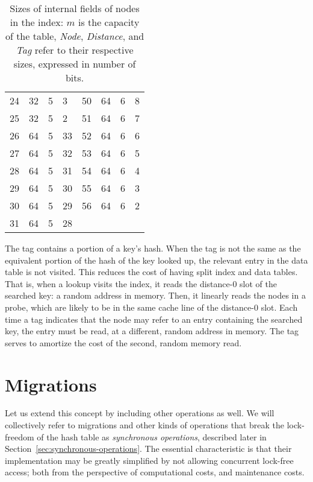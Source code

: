 \begin{table}
\begin{tabular}{llll|llll}
                  24       & 32   & 5        & 3   & 50       & 64   & 6        & 8   \\
                  25       & 32   & 5        & 2   & 51       & 64   & 6        & 7   \\
                  26       & 64   & 5        & 33  & 52       & 64   & 6        & 6   \\
                  27       & 64   & 5        & 32  & 53       & 64   & 6        & 5   \\
                  28       & 64   & 5        & 31  & 54       & 64   & 6        & 4   \\
                  29       & 64   & 5        & 30  & 55       & 64   & 6        & 3   \\
                  30       & 64   & 5        & 29  & 56       & 64   & 6        & 2   \\
                  31 & 64 & 5 & 28 & \\
    \end{tabular}
    \caption{Sizes of internal fields of nodes in the index: $m$ is the capacity of the table, \emph{Node}, \emph{Distance}, and \emph{Tag} refer to their respective sizes, expressed in number of bits.}
    \label{tab:nodes}
\end{table}

The tag contains a portion of a key's hash.
When the tag is not the same as the equivalent portion of the hash of the key looked up, the relevant entry in the data table is not visited.
This reduces the cost of having split index and data tables.
That is, when a lookup visits the index, it reads the distance-0 slot of the searched key: a random address in memory.
Then, it linearly reads the nodes in a probe, which are likely to be in the same cache line of the distance-0 slot.
Each time a tag indicates that the node may refer to an entry containing the searched key, the entry must be read, at a different, random address in memory.
The tag serves to amortize the cost of the second, random memory read.


\section{Migrations}\label{sec:migrations-design}


Let us extend this concept by including other operations as well.
We will collectively refer to migrations and other kinds of operations that break the lock-freedom of the hash table as \emph{synchronous operations}, described later in Section~\ref{sec:synchronous-operations}.
The essential characteristic is that their implementation may be greatly simplified by not allowing concurrent lock-free access; both from the perspective of computational costs, and maintenance costs.

